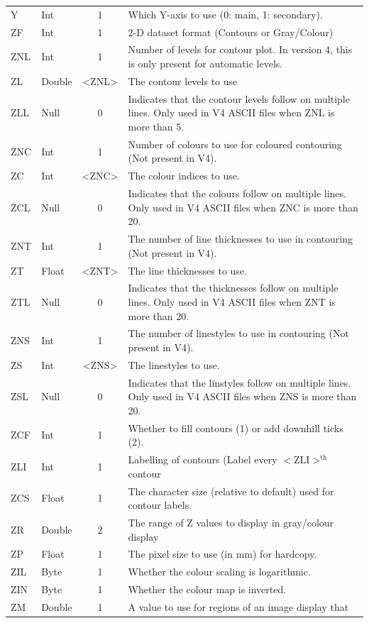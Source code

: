 \documentclass[english]{article}
\begin{document}
\begin{longtable}{|llcp{8cm}|}
  Y & Int & 1 & Which Y-axis to use (0: main, 1: secondary).\\
  ZF& Int& 1&
  2-D dataset format (Contours or Gray/Colour)\\
  ZNL& Int& 1&
  Number of levels for contour plot. In version 4, this is only present
  for automatic levels.\\
  ZL& Double& <ZNL>&
  The contour levels to use\\
  ZLL & Null & 0 & Indicates that the contour levels follow on multiple
  lines. Only used in V4 ASCII files when ZNL is more than 5.\\
  ZNC& Int& 1&
  Number of colours to use for coloured contouring (Not present in V4).\\
  ZC& Int& <ZNC>&
  The colour indices to use.\\
  ZCL & Null & 0 & Indicates that the colours follow on multiple
  lines. Only used in V4 ASCII files when ZNC is more than 20.\\
  ZNT& Int & 1&
  The number of line thicknesses to use in contouring (Not present in V4).\\
  ZT& Float& <ZNT>&
  The line thicknesses to use.\\
  ZTL & Null & 0 & Indicates that the thicknesses follow on multiple
  lines. Only used in V4 ASCII files when ZNT is more than 20.\\
  ZNS& Int& 1&
  The number of linestyles to use in contouring (Not present in V4).\\
  ZS& Int& <ZNS>&
  The linestyles to use.\\
  ZSL & Null & 0 & Indicates that the linstyles follow on multiple
  lines. Only used in V4 ASCII files when ZNS is more than 20.\\
  ZCF& Int& 1&
  Whether to fill contours (1) or add downhill ticks (2).\\
  ZLI& Int& 1&
  Labelling of contours (Label every $\mathrm{<ZLI>^{th}}$ contour\\
  ZCS & Float & 1 & The character size (relative to default) used for
  contour labels.\\
  ZR& Double& 2&
  The range of Z values to display in gray/colour display\\
  ZP& Float& 1&
  The pixel size to use (in mm) for hardcopy.\\
  ZIL & Byte & 1 & Whether the colour scaling is logarithmic.\\
  ZIN & Byte & 1 & Whether the colour map is inverted.\\
  ZM & Double & 1 & A value to use for regions of an image display that

\end{longtable}
\end{document}
